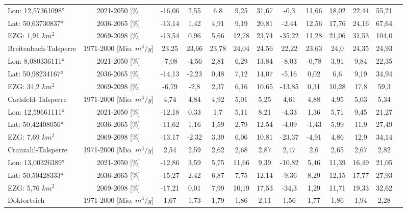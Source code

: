 \begin{longtable}{@{\extracolsep{\fill}}lc|ccccc||cccccc}
\cline{2-13} 
Lon: 12,57361098° & 2021-2050 [\%]  & -16,06 & 2,55 & 6,8 & 9,25 & 31,67 & -0,3 & 11,66 & 18,02 & 22,44 & 55,21 & \\ 
Lat: 50,63730837° & 2036-2065 [\%]  & -13,14 & 1,42 & 4,91 & 9,19 & 20,81 & -2,44 & 12,56 & 17,76 & 24,16 & 67,64 & \\ 
EZG: 1,91 $km^2$ & 2069-2098 [\%]  & -13,54 & 0,96 & 5,66 & 12,78 & 23,74 & -35,22 & 11,28 & 21,06 & 31,53 & 104,0 & \\ 
\hline 
Breitenbach-Talsperre & 1971-2000 [Mio. $m^3/y$]  & 23,25 & 23,66 & 23,78 & 24,04 & 24,56 & 22,22 & 23,63 & 24,0 & 24,35 & 24,93 & \\ 
\cline{2-13} 
Lon: 8,080336111° & 2021-2050 [\%]  & -7,08 & -4,56 & 2,81 & 6,29 & 13,84 & -8,03 & -0,78 & 3,91 & 9,84 & 22,35 & \\ 
Lat: 50,98234167° & 2036-2065 [\%]  & -14,13 & -2,23 & 0,48 & 7,12 & 14,07 & -5,16 & 0,02 & 6,6 & 9,19 & 34,94 & \\ 
EZG: 34,2 $km^2$ & 2069-2098 [\%]  & -6,79 & -2,8 & 2,37 & 6,16 & 10,65 & -13,85 & 0,31 & 10,28 & 17,8 & 59,3 & \\ 
\hline 
Carlsfeld-Talsperre & 1971-2000 [Mio. $m^3/y$]  & 4,74 & 4,84 & 4,92 & 5,01 & 5,25 & 4,61 & 4,88 & 4,95 & 5,03 & 5,34 & \\ 
\cline{2-13} 
Lon: 12,59661111° & 2021-2050 [\%]  & -12,18 & 0,33 & 1,7 & 5,11 & 8,21 & -4,33 & 1,36 & 5,71 & 9,45 & 21,27 & \\ 
Lat: 50,42408056° & 2036-2065 [\%]  & -11,62 & 1,16 & 1,59 & 2,79 & 12,54 & -4,09 & -1,43 & 5,99 & 11,9 & 27,49 & \\ 
EZG: 7,69 $km^2$ & 2069-2098 [\%]  & -13,17 & -2,32 & 3,39 & 6,06 & 10,81 & -23,37 & -4,91 & 4,86 & 12,9 & 34,14 & \\ 
\hline 
Cranzahl-Talsperre & 1971-2000 [Mio. $m^3/y$]  & 2,54 & 2,59 & 2,62 & 2,68 & 2,87 & 2,47 & 2,6 & 2,65 & 2,67 & 2,82 & \\ 
\cline{2-13} 
Lon: 13,00326389° & 2021-2050 [\%]  & -12,86 & 3,59 & 5,75 & 11,66 & 9,39 & -10,82 & 5,46 & 11,39 & 16,49 & 21,05 & \\ 
Lat: 50,50428333° & 2036-2065 [\%]  & -15,27 & 2,42 & 6,87 & 7,75 & 12,14 & -9,36 & 8,29 & 12,15 & 17,77 & 27,93 & \\ 
EZG: 5,76 $km^2$ & 2069-2098 [\%]  & -17,21 & 0,01 & 7,99 & 10,19 & 17,53 & -34,3 & 1,29 & 11,71 & 19,33 & 32,62 & \\ 
\hline 
Doktorteich & 1971-2000 [Mio. $m^3/y$]  & 1,67 & 1,73 & 1,79 & 1,86 & 2,11 & 1,56 & 1,77 & 1,86 & 1,94 & 2,28 & \\ 

\end{longtable}
